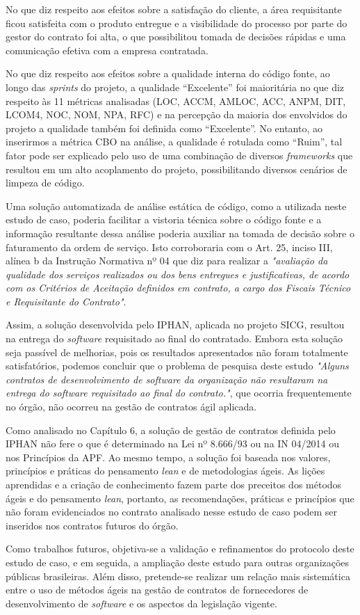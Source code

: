 No que diz respeito aos efeitos sobre a satisfação do cliente, a área requisitante ficou satisfeita com o produto entregue e a visibilidade do processo por parte do gestor do contrato foi alta, o que possibilitou tomada de decisões rápidas e uma comunicação efetiva com a empresa contratada.
 
No que diz respeito aos efeitos sobre a qualidade interna do código fonte, ao longo das \textit{sprints} do projeto, a qualidade “Excelente” foi maioritária no que diz respeito às 11 métricas analisadas (LOC, ACCM, AMLOC, ACC, ANPM, DIT, LCOM4, NOC, NOM, NPA, RFC) e na percepção da maioria dos envolvidos do projeto a qualidade também foi definida como “Excelente”. No entanto, ao inserirmos a métrica CBO na análise, a qualidade é rotulada como “Ruim”, tal fator pode ser explicado pelo uso de uma combinação de diversos \textit{frameworks} que resultou em um alto acoplamento do projeto, possibilitando diversos cenários de limpeza de código. 

Uma solução automatizada de análise estática de código, como a utilizada neste estudo de caso, poderia facilitar a vistoria técnica sobre o código fonte e a informação resultante dessa análise poderia auxiliar na tomada de decisão sobre o faturamento da ordem de serviço. Isto corroboraria com o Art. 25, inciso III, alínea b da Instrução Normativa nº 04 \cite{IN04:2010} que diz para realizar a \textit{"avaliação da qualidade dos serviços realizados ou dos bens entregues e justificativas, de acordo com os Critérios de Aceitação definidos em contrato, a cargo dos Fiscais Técnico e Requisitante do Contrato"}.

Assim, a solução desenvolvida pelo IPHAN, aplicada no projeto SICG, resultou na entrega do \textit{software} requisitado ao final do contratado.  Embora esta solução seja passível de melhorias, pois os resultados apresentados não foram totalmente satisfatórios, podemos concluir que o problema de pesquisa deste estudo \textit{"Alguns contratos de desenvolvimento de \textit{software} da organização não resultaram na entrega do \textit{software} requisitado ao final do contrato."}, que ocorria frequentemente no órgão, não ocorreu na gestão de contratos ágil aplicada.

Como analisado no Capítulo 6, a solução de gestão de contratos definida pelo IPHAN não fere o que é determinado na Lei nº 8.666/93 ou na IN 04/2014  ou nos Princípios da APF. Ao mesmo tempo, a solução foi baseada nos valores, princípios e práticas do pensamento \textit{lean} e de metodologias ágeis. As lições aprendidas e a criação de conhecimento fazem parte dos preceitos dos métodos ágeis e do pensamento \textit{lean}, portanto, as recomendações, práticas e princípios que não foram evidenciados no contrato analisado nesse estudo de caso podem ser inseridos nos contratos futuros do órgão. 
 
Como trabalhos futuros, objetiva-se a validação e refinamentos do protocolo deste estudo de caso, e em seguida, a ampliação deste estudo para outras organizações públicas brasileiras. Além disso, pretende-se realizar um relação mais sistemática entre o uso de métodos ágeis na gestão de contratos de fornecedores de desenvolvimento de \textit{software} e os aspectos da legislação vigente.
 
